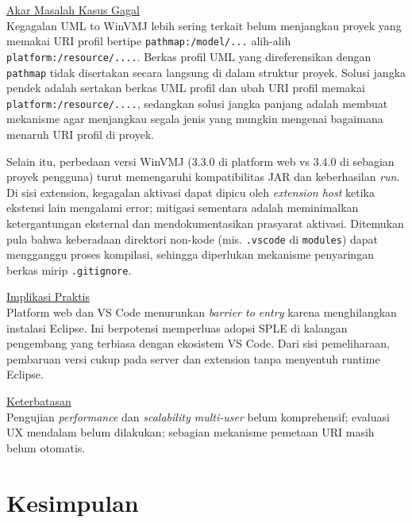 \documentclass[12pt,a4paper,onecolumn]{article}
\newcommand{\f}[1]{\textit{#1}}
\begin{document}
\vspace*{0.5\baselineskip}

\underline{Akar Masalah Kasus Gagal} \vspace{5pt} \\
Kegagalan UML to WinVMJ lebih sering terkait belum menjangkau proyek yang memakai URI profil bertipe \texttt{pathmap:/model/...} alih-alih \texttt{platform:/resource/....}. Berkas profil UML yang direferensikan dengan \texttt{pathmap} tidak disertakan secara langsung di dalam struktur
proyek. Solusi jangka pendek adalah sertakan berkas UML profil dan ubah URI profil memakai \texttt{platform:/resource/....}, sedangkan solusi jangka panjang adalah membuat mekanisme agar menjangkau segala jenis yang mungkin mengenai bagaimana menaruh URI profil di proyek.

Selain itu, perbedaan versi WinVMJ (3.3.0 di platform web vs 3.4.0 di sebagian proyek pengguna) turut memengaruhi kompatibilitas JAR dan keberhasilan \f{run}. Di sisi extension, kegagalan aktivasi dapat dipicu oleh \textit{extension host} ketika ekstensi lain mengalami error; mitigasi sementara adalah meminimalkan ketergantungan eksternal dan mendokumentasikan prasyarat aktivasi. Ditemukan pula bahwa keberadaan direktori non-kode (mis. \texttt{.vscode} di \texttt{modules}) dapat mengganggu proses kompilasi, sehingga diperlukan mekanisme penyaringan berkas mirip \texttt{.gitignore}.

\vspace*{0.5\baselineskip}

\underline{Implikasi Praktis} \vspace{5pt} \\
Platform web dan VS Code menurunkan \textit{barrier to entry} karena menghilangkan instalasi Eclipse. Ini berpotensi memperluas adopsi SPLE di kalangan pengembang yang terbiasa dengan ekosistem VS Code. Dari sisi pemeliharaan, pembaruan versi cukup pada server dan extension tanpa menyentuh runtime Eclipse.

\vspace*{0.5\baselineskip}

\underline{Keterbatasan} \vspace{5pt} \\
Pengujian \textit{performance} dan \textit{scalability multi-user} belum komprehensif; evaluasi UX mendalam belum dilakukan; sebagian mekanisme pemetaan URI masih belum otomatis.

\section*{Kesimpulan}
\vspace{10pt}
\end{document}
